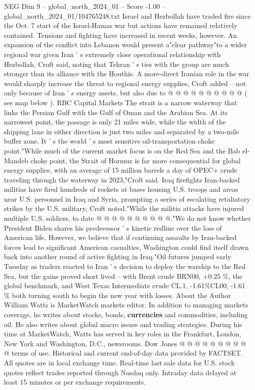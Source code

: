 \begin{textsample}{NEG Dim 9 – global\_north\_2024\_01 – Score -1.00 – global\_north\_2024\_01/104765248.txt}
Israel and Hezbollah have traded fire since the Oct. 7 start of the Israel-Hamas war but actions have remained relatively contained.
Tensions and fighting have increased in recent weeks, however.
An expansion of the conflict into Lebanon would present a"clear pathway"to a wider regional war given Iran ' s extremely close operational relationship with Hezbollah, Croft said, noting that Tehran ' s ties with the group are much stronger than its alliance with the Houthis.
A more-direct Iranian role in the war would sharply increase the threat to regional energy supplies, Croft added -- not only because of Iran ' s energy assets, but also due to @ @ @ @ @ @ @ @ @ @ ( see map below ).
RBC Capital Markets The strait is a narrow waterway that links the Persian Gulf with the Gulf of Oman and the Arabian Sea.
At its narrowest point, the passage is only 21 miles wide, while the width of the shipping lane in either direction is just two miles and separated by a two-mile buffer zone.
It ' s the world ' s most sensitive oil-transportation choke point."While much of the current market focus is on the Red Sea and the Bab el-Mandeb choke point, the Strait of Hormuz is far more consequential for global energy supplies, with an average of 15 million barrels a day of OPEC+ crude traveling through the waterway in 2023,"Croft said.
Iraq firefights Iran-backed militias have fired hundreds of rockets at bases housing U.S. troops and areas near U.S. personnel in Iraq and Syria, prompting a series of escalating retaliatory strikes by the U.S. military, Croft noted."While the militia attacks have injured multiple U.S. soldiers, to date @ @ @ @ @ @ @ @ @ @."We do not know whether President Biden shares his predecessor ' s kinetic redline over the loss of American life.
However, we believe that if continuing assaults by Iran-backed forces lead to significant American casualties, Washington could find itself drawn back into another round of active fighting in Iraq."Oil futures jumped early Tuesday as traders reacted to Iran ' s decision to deploy the warship to the Red Sea, but the gains proved short lived -- with Brent crude BRN00, +0.25 \%, the global benchmark, and West Texas Intermediate crude CL.1, -1.61\%CL00, -1.61 \% both turning south to begin the new year with losses.
About the Author William Watts is MarketWatch markets editor.
In addition to managing markets coverage, he writes about stocks, bonds, \textbf{currencies} and commodities, including oil.
He also writes about global macro issues and trading strategies.
During his time at MarketWatch, Watts has served in key roles in the Frankfurt, London, New York and Washington, D.C., newsrooms.
Dow Jones @ @ @ @ @ @ @ @ @ @ terms of use.
Historical and current end-of-day data provided by FACTSET.
All quotes are in local exchange time.
Real-time last sale data for U.S. stock quotes reflect trades reported through Nasdaq only.
Intraday data delayed at least 15 minutes or per exchange requirements.

\end{textsample}
